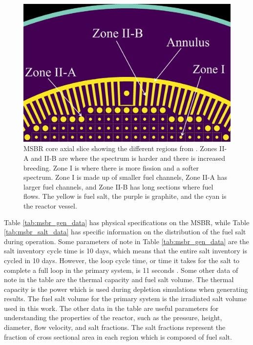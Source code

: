 \begin{figure}[H]
  \centering
  \includegraphics[scale=0.25]{images/msbr_ryk_1.PNG}
  \caption{MSBR core axial slice showing the different regions from \cite{rykhlevskii_modeling_2019}. Zones II-A and II-B are where the spectrum is harder and there is increased breeding. Zone I is where there is more fission and a softer spectrum. Zone I is made up of smaller fuel channels, Zone II-A has larger fuel channels, and Zone II-B has long sections where fuel flows. The yellow is fuel salt, the purple is graphite, and the cyan is the reactor vessel.}
   \label{fig:msbr_ryklev}
\end{figure}

Table \ref{tab:msbr_gen_data} has physical specifications on the MSBR, while Table \ref{tab:msbr_salt_data} has specific information on the distribution of the fuel salt during operation. Some parameters of note in Table \ref{tab:msbr_gen_data} are the salt inventory cycle time is 10 days, which means that the entire salt inventory is cycled in 10 days. However, the loop cycle time, or time it takes for the salt to complete a full loop in the primary system, is 11 seconds \cite{robertson_conceptual_1971}. Some other data of note in the table are the thermal capacity and fuel salt volume. The thermal capacity is the power which is used during depletion simulations when generating results. The fuel salt volume for the primary system is the irradiated salt volume used in this work. The other data in the table are useful parameters for understanding the properties of the reactor, such as the pressure, height, diameter, flow velocity, and salt fractions. The salt fractions represent the fraction of cross sectional area in each region which is composed of fuel salt.

